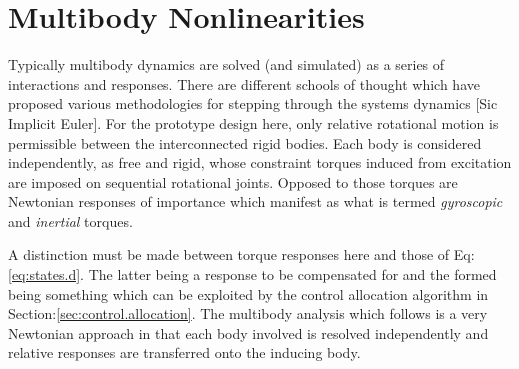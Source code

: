 \section{Multibody Nonlinearities}
\label{sec:dynamics.nonlinearities}
Typically multibody dynamics are solved (and simulated) as a series of interactions and responses. There are different schools of thought which have proposed various methodologies for stepping through the systems dynamics [Sic Implicit Euler\cite{physicallybased,multibodydynamics}]. For the prototype design here, only relative rotational motion is permissible between the interconnected rigid bodies. Each body is considered independently, as free and rigid, whose constraint torques induced from excitation are imposed on sequential rotational joints. Opposed to those torques are Newtonian responses of importance which manifest as what is termed \emph{gyroscopic} and \emph{inertial} torques. 
\par
A distinction must be made between torque responses here and those of Eq:\ref{eq:states.d}. The latter being a response to be compensated for and the formed being something which can be exploited by the control allocation algorithm in Section:\ref{sec:control.allocation}. The multibody analysis which follows is a very Newtonian approach in that each body involved is resolved independently and relative responses are transferred onto the inducing body.
